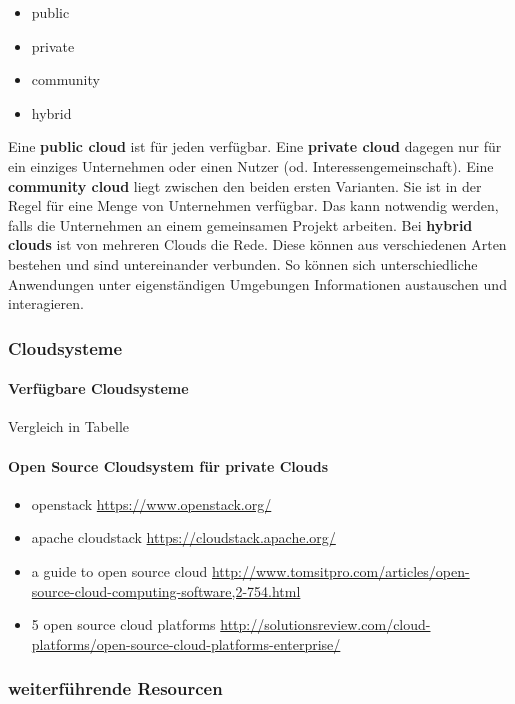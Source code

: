 \documentclass[a4paper,10pt]{article}
\begin{document}
\begin{itemize}
 \item public
 \item private
 \item community
 \item hybrid
\end{itemize}

Eine \textbf{public cloud} ist für jeden verfügbar.
Eine \textbf{private cloud} dagegen nur für ein einziges Unternehmen oder einen Nutzer (od. Interessengemeinschaft).
Eine \textbf{community cloud} liegt zwischen den beiden ersten Varianten. 
Sie ist in der Regel für eine Menge von Unternehmen verfügbar.
Das kann notwendig werden, falls die Unternehmen an einem gemeinsamen Projekt arbeiten.
Bei \textbf{hybrid clouds} ist von mehreren Clouds die Rede.
Diese können aus verschiedenen Arten bestehen und sind untereinander verbunden.
So können sich unterschiedliche Anwendungen unter eigenständigen Umgebungen Informationen austauschen und interagieren.

\subsubsection{Cloudsysteme}

\paragraph{Verfügbare Cloudsysteme}

Vergleich in Tabelle

\paragraph{Open Source Cloudsystem für private Clouds}

\begin{itemize}
 \item openstack \url{https://www.openstack.org/}
 \item apache cloudstack \url{https://cloudstack.apache.org/}
 \item a guide to open source cloud \url{http://www.tomsitpro.com/articles/open-source-cloud-computing-software,2-754.html}
 \item 5 open source cloud platforms \url{http://solutionsreview.com/cloud-platforms/open-source-cloud-platforms-enterprise/}
\end{itemize}

\subsubsection{weiterführende Resourcen}
\end{document}
